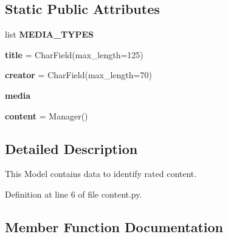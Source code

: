 \subsection*{Static Public Attributes}
\begin{DoxyCompactItemize}
\item 
list {\bfseries M\+E\+D\+I\+A\+\_\+\+T\+Y\+P\+ES}
\item 
\mbox{\label{classcapstoneproject_1_1models_1_1models_1_1content_1_1_content_aac895642300266917e51aa15f9d74a32}} 
{\bfseries title} = Char\+Field(max\+\_\+length=125)
\item 
\mbox{\label{classcapstoneproject_1_1models_1_1models_1_1content_1_1_content_a465a9cc9b0c363d3f96175b23bf04ca5}} 
{\bfseries creator} = Char\+Field(max\+\_\+length=70)
\item 
{\bfseries media}
\item 
\mbox{\label{classcapstoneproject_1_1models_1_1models_1_1content_1_1_content_a2a5941500501dfbd81d13fdb788794d6}} 
{\bfseries content} = Manager()
\end{DoxyCompactItemize}


\subsection{Detailed Description}
\begin{DoxyVerb}This Model contains data to identify rated content.
\end{DoxyVerb}
 

Definition at line 6 of file content.\+py.



\subsection{Member Function Documentation}
\mbox{\label{classcapstoneproject_1_1models_1_1models_1_1content_1_1_content_a2a41e3455e60f9c3dc3d46783381cc36}} 
